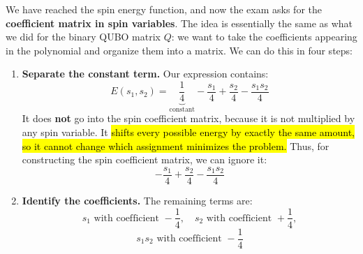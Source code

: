 \highspace
{} We have reached the spin energy function, and now the exam asks for the \textbf{coefficient matrix in spin variables}. The idea is essentially the same as what we did for the binary QUBO matrix $Q$: we want to take the coefficients appearing in the polynomial and organize them into a matrix. We can do this in four steps:
\begin{enumerate}
    \item \textbf{Separate the constant term.} Our expression contains:
        \begin{equation*}
            E(s_1, s_2) = \underbrace{\frac{1}{4}}_{\text{constant}} - \frac{s_1}{4} + \frac{s_2}{4} - \frac{s_1 s_2}{4}
        \end{equation*}
        It does \textbf{not} go into the spin coefficient matrix, because it is not multiplied by any spin variable. It \hl{shifts every possible energy by exactly the same amount, so it cannot change which assignment minimizes the problem.} Thus, for constructing the spin coefficient matrix, we can ignore it:
        \begin{equation*}
            - \frac{s_1}{4} + \frac{s_2}{4} - \frac{s_1 s_2}{4}
        \end{equation*}

    \item \textbf{Identify the coefficients.} The remaining terms are:
        \begin{equation*}
            s_1 \text{ with coefficient } -\frac{1}{4}, \quad
            s_2 \text{ with coefficient } +\frac{1}{4},
        \end{equation*}
        \begin{equation*}
            s_1 s_2 \text{ with coefficient } -\frac{1}{4}
        \end{equation*}


\end{enumerate}
